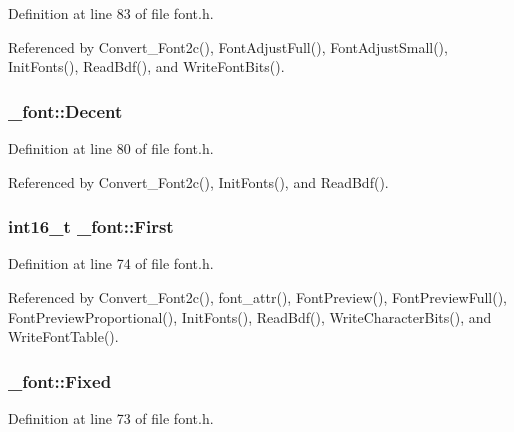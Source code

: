 Definition at line 83 of file font.\+h.



Referenced by Convert\+\_\+\+Font2c(), Font\+Adjust\+Full(), Font\+Adjust\+Small(), Init\+Fonts(), Read\+Bdf(), and Write\+Font\+Bits().

\subsubsection[{\texorpdfstring{Decent}{Decent}}]{ \+\_\+font\+::\+Decent}\hypertarget{struct__font_a7f3567884a6aa454b7414b10dba35755}{}\label{struct__font_a7f3567884a6aa454b7414b10dba35755}


Definition at line 80 of file font.\+h.



Referenced by Convert\+\_\+\+Font2c(), Init\+Fonts(), and Read\+Bdf().

\subsubsection[{\texorpdfstring{First}{First}}]{\setlength{\rightskip}{0pt plus 5cm}int16\+\_\+t \+\_\+font\+::\+First}\hypertarget{struct__font_a73decb2a2c2880dc782cd9cda5561876}{}\label{struct__font_a73decb2a2c2880dc782cd9cda5561876}


Definition at line 74 of file font.\+h.



Referenced by Convert\+\_\+\+Font2c(), font\+\_\+attr(), Font\+Preview(), Font\+Preview\+Full(), Font\+Preview\+Proportional(), Init\+Fonts(), Read\+Bdf(), Write\+Character\+Bits(), and Write\+Font\+Table().

\subsubsection[{\texorpdfstring{Fixed}{Fixed}}]{ \+\_\+font\+::\+Fixed}\hypertarget{struct__font_a76218c6b35acb78926429f247cbaa687}{}\label{struct__font_a76218c6b35acb78926429f247cbaa687}


Definition at line 73 of file font.\+h.



